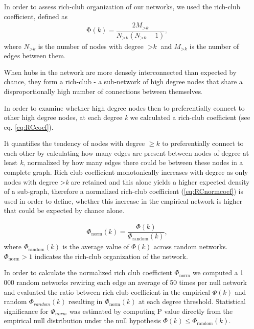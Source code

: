 \documentclass[10pt,letterpaper]{article}
\begin{document}
In order to assess rich-club organization of our networks, we used the rich-club coefficient, defined as
\begin{eqnarray} \label{eq:RCcoef}
    \mathrm{\Phi(\textit{k})} = \dfrac{2M_{>\textit{k}}}{N_{>\textit{k}}(N_{>\textit{k}}-1)},
\end{eqnarray}
where $N_{>\textit{k}}$ is the number of nodes with degree $>\textit{k}$ and $M_{>\textit{k}}$ is the number of edges between them.

When hubs in the network are more densely interconnected than expected by chance, they form a rich-club - a sub-network of high degree nodes that share a disproportionally high number of connections between themselves.

In order to examine whether high degree nodes then to preferentially connect to other high degree nodes, at each degree \textit{k} we calculated a rich-club coefficient (see eq. \ref{eq:RCcoef}).

It quantifies the tendency of nodes with degree $\geq k$ to preferentially connect to each other by calculating how many edges are present between nodes of degree at least \textit{k}, normalized by how many edges there could be between these nodes in a complete graph.
Rich club coefficient monotonically increases with degree as only nodes with degree >\textit{k} are retained and this alone yields a higher expected density of a sub-graph, therefore a normalized rich-club coefficient (\ref{eq:RCnormcoef}) is used in order to define, whether this increase in the empirical network is higher that could be expected by chance alone.

\begin{eqnarray}
	\label{eq:RCnormcoef}
     \Phi_\mathrm{norm}(k) = \dfrac{\Phi(k)}{\Phi_\mathrm{random}(k)},
	 \end{eqnarray}
where $\Phi_\mathrm{random}(k)$ is the average value of $\Phi(k)$ across random networks.
$\Phi_\mathrm{norm}>1$ indicates the rich-club organization of the network.

In order to calculate the normalized rich club coefficient $\Phi_\mathrm{norm}$ we computed a 1\,000 random networks rewiring each edge an average of 50 times per null network and evaluated the ratio between rich club coefficient in the empirical $\Phi(k)$ and random $\Phi_{random}(k)$ resulting in $\Phi_\mathrm{norm}(k)$ at each degree threshold.
Statistical significance for $\Phi_{norm}$ was estimated by computing P value directly from the empirical null distribution under the null hypothesis $\Phi(k) \leq \Phi_\mathrm{random}(k)$.
\end{document}

